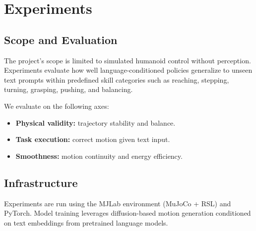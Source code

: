 \section{Experiments}
\label{sec:experiments}

\subsection{Scope and Evaluation}

The project’s scope is limited to simulated humanoid control without perception.
Experiments evaluate how well language-conditioned policies generalize to unseen text prompts within predefined skill categories such as reaching, stepping, turning, grasping, pushing, and balancing.

We evaluate on the following axes:
\begin{itemize}
    \item \textbf{Physical validity:} trajectory stability and balance.
    \item \textbf{Task execution:} correct motion given text input.
    \item \textbf{Smoothness:} motion continuity and energy efficiency.
\end{itemize}

\subsection{Infrastructure}

Experiments are run using the MJLab environment (MuJoCo + RSL) and PyTorch.
Model training leverages diffusion-based motion generation conditioned on text embeddings from pretrained language models.